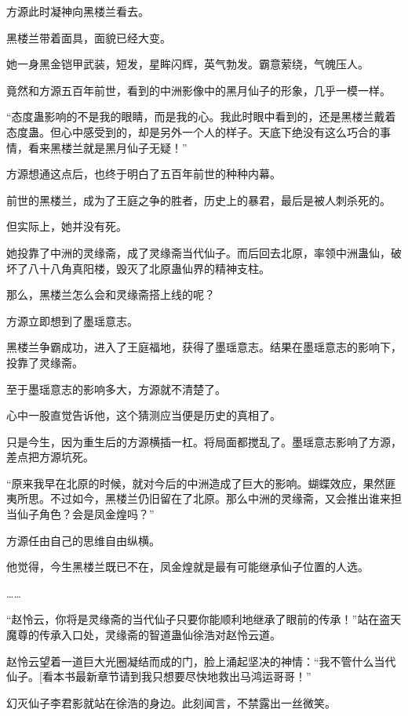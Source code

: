 
\begin{this_body}

方源此时凝神向黑楼兰看去。

黑楼兰带着面具，面貌已经大变。

她一身黑金铠甲武装，短发，星眸闪辉，英气勃发。霸意萦绕，气魄压人。

竟然和方源五百年前世，看到的中洲影像中的黑月仙子的形象，几乎一模一样。

“态度蛊影响的不是我的眼睛，而是我的心。我此时眼中看到的，还是黑楼兰戴着态度蛊。但心中感受到的，却是另外一个人的样子。天底下绝没有这么巧合的事情，看来黑楼兰就是黑月仙子无疑！”

方源想通这点后，也终于明白了五百年前世的种种内幕。

前世的黑楼兰，成为了王庭之争的胜者，历史上的暴君，最后是被人刺杀死的。

但实际上，她并没有死。

她投靠了中洲的灵缘斋，成了灵缘斋当代仙子。而后回去北原，率领中洲蛊仙，破坏了八十八角真阳楼，毁灭了北原蛊仙界的精神支柱。

那么，黑楼兰怎么会和灵缘斋搭上线的呢？

方源立即想到了墨瑶意志。

黑楼兰争霸成功，进入了王庭福地，获得了墨瑶意志。结果在墨瑶意志的影响下，投靠了灵缘斋。

至于墨瑶意志的影响多大，方源就不清楚了。

心中一股直觉告诉他，这个猜测应当便是历史的真相了。

只是今生，因为重生后的方源横插一杠。将局面都搅乱了。墨瑶意志影响了方源，差点把方源坑死。

“原来我早在北原的时候，就对今后的中洲造成了巨大的影响。蝴蝶效应，果然匪夷所思。不过如今，黑楼兰仍旧留在了北原。那么中洲的灵缘斋，又会推出谁来担当仙子角色？会是凤金煌吗？”

方源任由自己的思维自由纵横。

他觉得，今生黑楼兰既已不在，凤金煌就是最有可能继承仙子位置的人选。

……

“赵怜云，你将是灵缘斋的当代仙子只要你能顺利地继承了眼前的传承！”站在盗天魔尊的传承入口处，灵缘斋的智道蛊仙徐浩对赵怜云道。

赵怜云望着一道巨大光圈凝结而成的门，脸上涌起坚决的神情：“我不管什么当代仙子。[看本书最新章节请到我只想要尽快地救出马鸿运哥哥！”

幻灭仙子李君影就站在徐浩的身边。此刻闻言，不禁露出一丝微笑。


\end{this_body}
